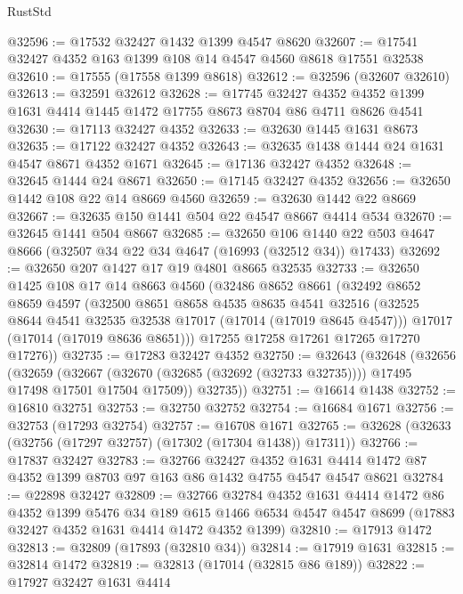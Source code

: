 \begin{lexlean}{RustStd}
\begin{coremodule}
@32596 := @17532 @32427 @1432 @1399 @4547 @8620
@32607 := @17541 @32427 @4352 @163 @1399 @108 @14 @4547 @4560 @8618 @17551 @32538
@32610 := @17555 (@17558 @1399 @8618)
@32612 := @32596 (@32607 @32610)
@32613 := @32591 @32612
@32628 := @17745
    @32427
    @4352
    @4352
    @1399
    @1631
    @4414
    @1445
    @1472
    @17755
    @8673
    @8704
    @86
    @4711
    @8626
    @4541
@32630 := @17113 @32427 @4352
@32633 := @32630 @1445 @1631 @8673
@32635 := @17122 @32427 @4352
@32643 := @32635 @1438 @1444 @24 @1631 @4547 @8671 @4352 @1671
@32645 := @17136 @32427 @4352
@32648 := @32645 @1444 @24 @8671
@32650 := @17145 @32427 @4352
@32656 := @32650 @1442 @108 @22 @14 @8669 @4560
@32659 := @32630 @1442 @22 @8669
@32667 := @32635 @150 @1441 @504 @22 @4547 @8667 @4414 @534
@32670 := @32645 @1441 @504 @8667
@32685 := @32650
    @106
    @1440
    @22
    @503
    @4647
    @8666
    (@32507 @34 @22 @34 @4647 (@16993 (@32512 @34)) @17433)
@32692 := @32650 @207 @1427 @17 @19 @4801 @8665 @32535
@32733 := @32650
    @1425
    @108
    @17
    @14
    @8663
    @4560
    (@32486
      @8652
      @8661
      (@32492
        @8652
        @8659
        @4597
        (@32500
          @8651
          @8658
          @4535
          @8635
          @4541
          @32516
          (@32525 @8644 @4541 @32535 @32538 @17017 (@17014 (@17019 @8645 @4547)))
          @17017
          (@17014 (@17019 @8636 @8651)))
        @17255
        @17258
        @17261
        @17265
        @17270
        @17276))
@32735 := @17283 @32427 @4352
@32750 := @32643
    (@32648
      (@32656
        (@32659
          (@32667 (@32670 (@32685 (@32692 (@32733 @32735)))) @17495 @17498 @17501 @17504 @17509))
        @32735))
@32751 := @16614 @1438
@32752 := @16810 @32751
@32753 := @32750 @32752
@32754 := @16684 @1671
@32756 := @32753 (@17293 @32754)
@32757 := @16708 @1671
@32765 := @32628 (@32633 (@32756 (@17297 @32757) (@17302 (@17304 @1438)) @17311))
@32766 := @17837 @32427
@32783 := @32766
    @32427
    @4352
    @1631
    @4414
    @1472
    @87
    @4352
    @1399
    @8703
    @97
    @163
    @86
    @1432
    @4755
    @4547
    @4547
    @8621
@32784 := @22898 @32427
@32809 := @32766
    @32784
    @4352
    @1631
    @4414
    @1472
    @86
    @4352
    @1399
    @5476
    @34
    @189
    @615
    @1466
    @6534
    @4547
    @4547
    @8699
    (@17883 @32427 @4352 @1631 @4414 @1472 @4352 @1399)
@32810 := @17913 @1472
@32813 := @32809 (@17893 (@32810 @34))
@32814 := @17919 @1631
@32815 := @32814 @1472
@32819 := @32813 (@17014 (@32815 @86 @189))
@32822 := @17927 @32427 @1631 @4414

\end{coremodule}
\end{lexlean}
